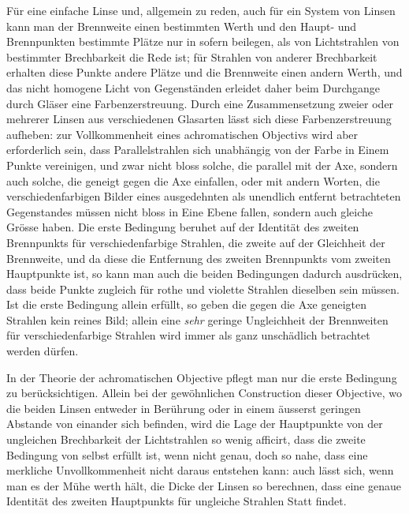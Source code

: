 Für eine einfache Linse und, allgemein zu reden, auch für ein System von Linsen kann man der Brennweite einen bestimmten Werth und den Haupt- und Brennpunkten bestimmte Plätze nur in sofern beilegen, als von Lichtstrahlen von bestimmter Brechbarkeit die Rede ist; für Strahlen von anderer Brechbarkeit erhalten diese Punkte andere Plätze und die Brennweite einen andern Werth, und das nicht homogene Licht von Gegenständen erleidet daher beim Durchgange durch Gläser eine Farbenzerstreuung. Durch eine Zusammensetzung zweier oder
mehrerer Linsen aus verschiedenen Glasarten lässt sich diese Farbenzerstreuung aufheben: zur Vollkommenheit eines achromatischen Objectivs wird aber erforderlich sein, dass Parallelstrahlen sich unabhängig von der Farbe in Einem Punkte vereinigen, und zwar nicht bloss solche, die parallel mit der Axe, sondern auch solche, die geneigt gegen die Axe einfallen, oder mit andern Worten, die verschiedenfarbigen Bilder eines ausgedehnten als unendlich entfernt betrachteten Gegenstandes müssen nicht bloss in Eine Ebene fallen, sondern auch gleiche Grösse haben. Die erste Bedingung beruhet auf der Identität des zweiten Brennpunkts für verschiedenfarbige Strahlen, die zweite auf der Gleichheit der Brennweite, und da diese die Entfernung des zweiten Brennpunkts vom zweiten Hauptpunkte ist, so kann man auch die beiden Bedingungen dadurch ausdrücken, dass beide Punkte zugleich für rothe und violette Strahlen dieselben sein müssen. Ist die erste Bedingung allein erfüllt, so geben die gegen die Axe geneigten Strahlen kein reines Bild; allein eine \textit{sehr} geringe Ungleichheit der Brennweiten für verschiedenfarbige Strahlen wird immer als ganz unschädlich betrachtet werden dürfen.

In der Theorie der achromatischen Objective pflegt man nur die erste Bedingung zu berücksichtigen. Allein bei der gewöhnlichen Construction dieser Objective, wo die beiden Linsen entweder in Berührung oder in einem äusserst geringen Abstande von einander sich befinden, wird die Lage der Hauptpunkte von der ungleichen Brechbarkeit der Lichtstrahlen so wenig afficirt, dass die zweite Bedingung von selbst erfüllt ist, wenn nicht genau, doch so nahe, dass eine merkliche Unvollkommenheit nicht daraus entstehen kann: auch lässt sich, wenn man es der Mühe werth hält, die Dicke der Linsen so berechnen, dass eine genaue Identität des zweiten Hauptpunkts für ungleiche Strahlen Statt findet.


